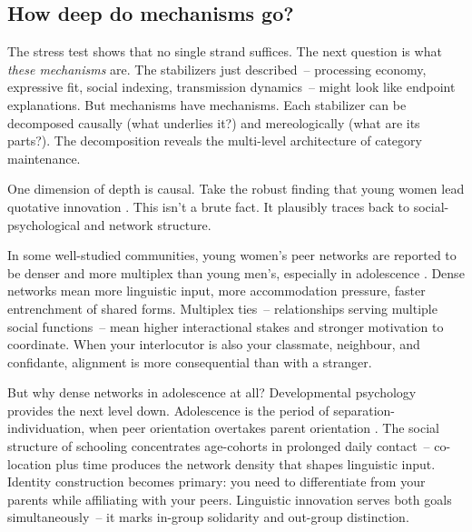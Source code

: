 \subsection{How deep do mechanisms go?}
\label{sec:6:how-deep}

The stress test shows that no single strand suffices. The next question is what \emph{these mechanisms} are. The stabilizers just described~-- processing economy, expressive fit, social indexing, transmission dynamics~-- might look like endpoint explanations. But mechanisms have mechanisms. Each stabilizer can be decomposed causally (what underlies it?) and mereologically (what are its parts?). The decomposition reveals the multi-level architecture of category maintenance.

One dimension of depth is causal. Take the robust finding that young women lead quotative innovation \autocite{labov2001,tagliamontedarcy2004}. This isn't a brute fact. It plausibly traces back to social-psychological and network structure.

In some well-studied communities, young women's peer networks are reported to be denser and more multiplex than young men's, especially in adolescence \autocite{milroy1987}. Dense networks mean more linguistic input, more accommodation pressure, faster entrenchment of shared forms. Multiplex ties~-- relationships serving multiple social functions~-- mean higher interactional stakes and stronger motivation to coordinate. When your interlocutor is also your classmate, neighbour, and confidante, alignment is more consequential than with a stranger.

But why dense networks in adolescence at all? Developmental psychology provides the next level down. Adolescence is the period of separation-individuation, when peer orientation overtakes parent orientation \autocite{erikson1968}. The social structure of schooling concentrates age-cohorts in prolonged daily contact~-- co-location plus time produces the network density that shapes linguistic input. Identity construction becomes primary: you need to differentiate from your parents while affiliating with your peers. Linguistic innovation serves both goals simultaneously~-- it marks in-group solidarity and out-group distinction.

